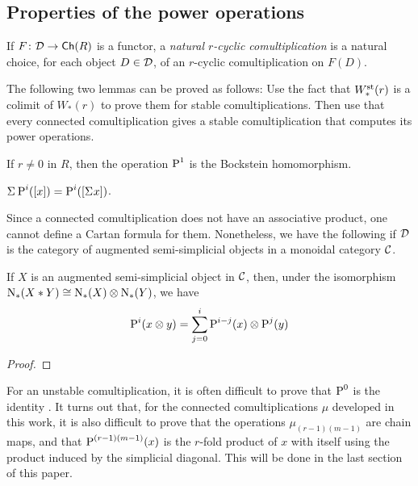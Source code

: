 \subsection{Properties of the power operations}
If $F\colon \mathcal{D}\to \mathsf{Ch}(R)$ is a functor, a \emph{natural $r$-cyclic comultiplication} is a natural choice, for each object $D\in \mathcal{D}$, of an $r$-cyclic comultiplication on $F(D)$. 


The following two lemmas can be proved as follows: Use the fact that $W^{\mathrm{st}}_*(r)$ is a colimit of $W_*(r)$ to prove them for stable comultiplications. Then use that every connected comultiplication gives a stable comultiplication that computes its power operations.
\begin{lemma}
    If $r\neq 0$ in $R$, then the operation $\operatorname{P}^1$ is the Bockstein homomorphism.
\end{lemma}
\begin{lemma}
    $\Sigma^{} \operatorname{P}^i([x]) = \operatorname{P}^i([\Sigma^{} x])$.
\end{lemma}
Since a connected comultiplication does not have an associative product, one cannot define a Cartan formula for them. Nonetheless, we have the following if $\mathcal{D}$ is the category of augmented semi-simplicial objects in a monoidal category $\mathcal{C}$.
\begin{lemma}
    If $X$ is an augmented semi-simplicial object in $\mathcal{C}$, then, under the isomorphism $\operatorname{N}_*(X*Y)\cong \operatorname{N}_*(X)\otimes\operatorname{N}_*(Y)$, we have 
    \[
        \operatorname{P}^i(x\otimes y) = \sum_{j=0}^{i} \operatorname{P}^{i-j}(x)\otimes \operatorname{P}^j(y)
    \]
\end{lemma}
\begin{proof} 
\end{proof}

For an unstable comultiplication, it is often difficult to prove that $\operatorname{P}^0$ is the identity \cite{may1970general}. It turns out that, for the connected comultiplications $\mu$ developed in this work, it is also difficult to prove that the operations $\mu_{(r-1)(m-1)}$ are chain maps, and that $\operatorname{P}^{(r-1)(m-1)}(x)$ is the $r$-fold product of $x$ with itself using the product induced by the simplicial diagonal. This will be done in the last section of this paper. 

